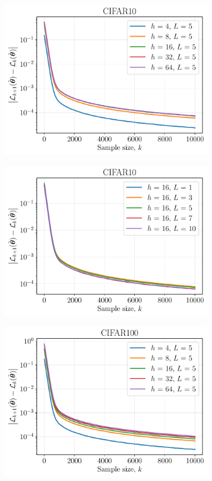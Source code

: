 \documentclass{article}
\begin{document}
\begin{figure}[ht]
\begin{subfigure}[b]{0.5\linewidth}
    \includegraphics[width=\linewidth]{figs/cifar10_hidden_size.pdf} 
  \end{subfigure}%
  \begin{subfigure}[b]{0.5\linewidth}
    \centering
    \includegraphics[width=\linewidth]{figs/cifar10_num_layers.pdf} 
  \end{subfigure} 
  \begin{subfigure}[b]{0.5\linewidth}
    \centering
    \includegraphics[width=\linewidth]{figs/cifar100_hidden_size.pdf} 

\end{subfigure}
\end{figure}
\end{document}
